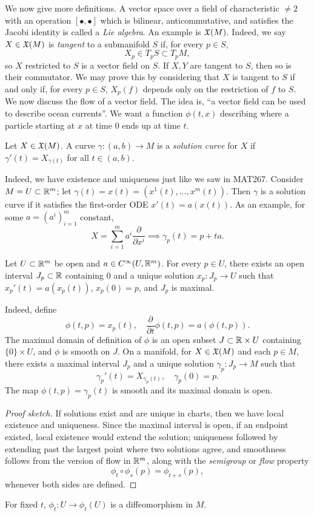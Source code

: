 We now give more definitions. A vector space over a field of characteristic $\neq 2$ with an operation $[\bullet, \bullet]$ which is bilinear, anticommutative, and satisfies the Jacobi identity is called a \textit{Lie algebra}. An example is $\mathfrak X(M)$. Indeed, we say $X \in \mathfrak X(M)$ is \textit{tangent} to a submanifold $S$ if, for every $p \in S$,
\[ X_p \in T_p S \subset T_p M, \]
so $X$ restricted to $S$ is a vector field on $S$. If $X, Y$ are tangent to $S$, then so is their commutator. We may prove this by considering that $X$ is tangent to $S$ if and only if, for every $p \in S$, $X_p(f)$ depends only on the restriction of $f$ to $S$.
\\[8pt]
We now discuss the flow of a vector field. The idea is, ``a vector field can be used to describe ocean currents''. We want a function $\phi(t, x)$ describing where a particle starting at $x$ at time $0$ ends up at time $t$.
\begin{definition}
    Let $X \in \mathfrak X(M)$. A curve $\gamma \colon (a, b) \to M$ is a \textit{solution curve} for $X$ if $\gamma'(t) = X_{\gamma(t)}$ for all $t \in (a, b)$.
\end{definition}
Indeed, we have existence and uniqueness just like we saw in MAT267. Consider $M = U \subset \mathbb R^m$; let $\gamma(t) = x(t) = (x^1(t), \dots, x^m(t))$. Then $\gamma$ is a solution curve if it satisfies the first-order ODE $x'(t) = a(x(t))$. As an example, for some $a = (a^i)_{i=1}^m$ constant,
\[ X = \sum_{i=1}^m a^i \frac{\partial}{\partial x^i} \implies \gamma_p(t) = p + ta. \]
\begin{theorem}
    Let $U \subset \mathbb R^m$ be open and $a \in C^\infty(U, \mathbb R^m)$. For every $p \in U$, there exists an open interval $J_p \subset \mathbb R$ containing $0$ and a unique solution $x_p \colon J_p \to U$ such that $x_p'(t) = a(x_p(t))$, $x_p(0) = p$, and $J_p$ is maximal.
\end{theorem}
Indeed, define
\[ \phi(t, p) = x_p(t), \quad \frac{\partial}{\partial t} \phi(t, p) = a(\phi(t, p)). \]
The maximal domain of definition of $\phi$ is an open subset $J \subset \mathbb R \times U$ containing $\{0\} \times U$, and $\phi$ is smooth on $J$. On a manifold, for $X \in \mathfrak X(M)$ and each $p \in M$, there exists a maximal interval $J_p$ and a unique solution $\gamma_p \colon J_p \to M$ such that
\[ \gamma_p'(t) = X_{\gamma_p(t)}, \quad \gamma_p(0) = p. \]
The map $\phi(t, p) = \gamma_p(t)$ is smooth and its maximal domain is open.
\begin{proof}[Proof sketch]
    If solutions exist and are unique in charts, then we have local existence and uniqueness. Since the maximal interval is open, if an endpoint existed, local existence would extend the solution; uniqueness followed by extending past the largest point where two solutions agree, and smoothness follows from the version of flow in $\mathbb R^m$, along with the \textit{semigroup} or \textit{flow} property
    \[ \phi_t \circ \phi_s(p) = \phi_{t+s}(p), \]
    whenever both sides are defined.
\end{proof}
\begin{corollary}
    For fixed $t$, $\phi_t \colon U \to \phi_t(U)$ is a diffeomorphism in $M$.
\end{corollary}
